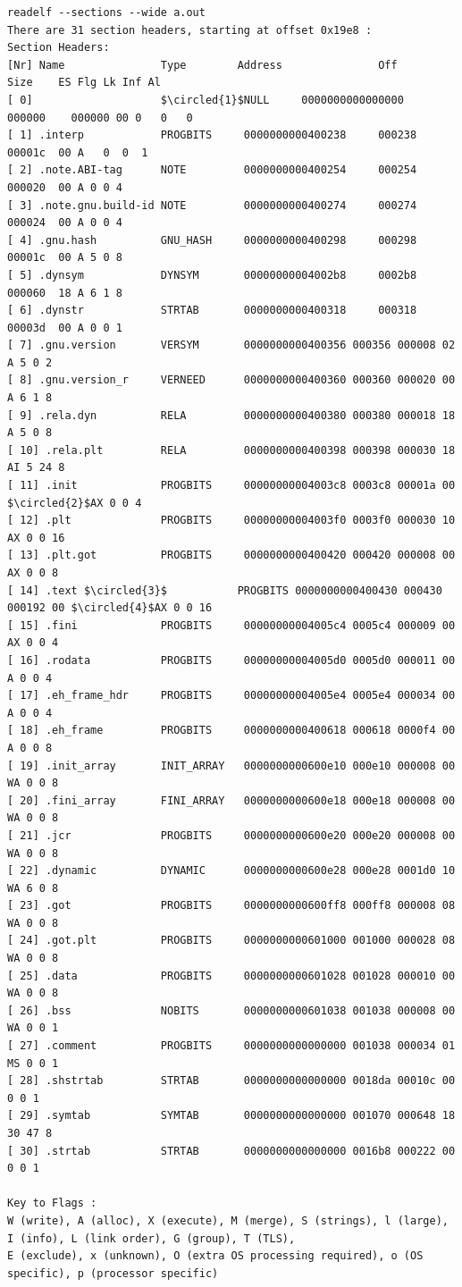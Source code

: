 \documentclass[]{project_plan}
\newcommand*\circled[1]{\tikz[baseline=(char.base)]{
            \node[shape=circle,draw,inner sep=2pt] (char) {#1};}}
\begin{document}
\begin{lstlisting}[mathescape]
readelf --sections --wide a.out
There are 31 section headers, starting at offset 0x19e8 :
Section Headers:
[Nr] Name               Type        Address               Off       Size    ES Flg Lk Inf Al
[ 0]                    $\circled{1}$NULL     0000000000000000     000000    000000 00 0   0   0
[ 1] .interp            PROGBITS     0000000000400238     000238    00001c  00 A   0  0  1
[ 2] .note.ABI-tag      NOTE         0000000000400254     000254    000020  00 A 0 0 4
[ 3] .note.gnu.build-id NOTE         0000000000400274     000274    000024  00 A 0 0 4
[ 4] .gnu.hash          GNU_HASH     0000000000400298     000298    00001c  00 A 5 0 8
[ 5] .dynsym            DYNSYM       00000000004002b8     0002b8    000060  18 A 6 1 8
[ 6] .dynstr            STRTAB       0000000000400318     000318    00003d  00 A 0 0 1
[ 7] .gnu.version       VERSYM       0000000000400356 000356 000008 02 A 5 0 2
[ 8] .gnu.version_r     VERNEED      0000000000400360 000360 000020 00 A 6 1 8
[ 9] .rela.dyn          RELA         0000000000400380 000380 000018 18 A 5 0 8
[ 10] .rela.plt         RELA         0000000000400398 000398 000030 18 AI 5 24 8
[ 11] .init             PROGBITS     00000000004003c8 0003c8 00001a 00 $\circled{2}$AX 0 0 4
[ 12] .plt              PROGBITS     00000000004003f0 0003f0 000030 10 AX 0 0 16
[ 13] .plt.got          PROGBITS     0000000000400420 000420 000008 00 AX 0 0 8
[ 14] .text $\circled{3}$           PROGBITS 0000000000400430 000430 000192 00 $\circled{4}$AX 0 0 16
[ 15] .fini             PROGBITS     00000000004005c4 0005c4 000009 00 AX 0 0 4
[ 16] .rodata           PROGBITS     00000000004005d0 0005d0 000011 00 A 0 0 4
[ 17] .eh_frame_hdr     PROGBITS     00000000004005e4 0005e4 000034 00 A 0 0 4
[ 18] .eh_frame         PROGBITS     0000000000400618 000618 0000f4 00 A 0 0 8
[ 19] .init_array       INIT_ARRAY   0000000000600e10 000e10 000008 00 WA 0 0 8
[ 20] .fini_array       FINI_ARRAY   0000000000600e18 000e18 000008 00 WA 0 0 8
[ 21] .jcr              PROGBITS     0000000000600e20 000e20 000008 00 WA 0 0 8
[ 22] .dynamic          DYNAMIC      0000000000600e28 000e28 0001d0 10 WA 6 0 8
[ 23] .got              PROGBITS     0000000000600ff8 000ff8 000008 08 WA 0 0 8
[ 24] .got.plt          PROGBITS     0000000000601000 001000 000028 08 WA 0 0 8
[ 25] .data             PROGBITS     0000000000601028 001028 000010 00 WA 0 0 8
[ 26] .bss              NOBITS       0000000000601038 001038 000008 00 WA 0 0 1
[ 27] .comment          PROGBITS     0000000000000000 001038 000034 01 MS 0 0 1
[ 28] .shstrtab         STRTAB       0000000000000000 0018da 00010c 00 0 0 1
[ 29] .symtab           SYMTAB       0000000000000000 001070 000648 18 30 47 8
[ 30] .strtab           STRTAB       0000000000000000 0016b8 000222 00 0 0 1

Key to Flags :
W (write), A (alloc), X (execute), M (merge), S (strings), l (large), I (info), L (link order), G (group), T (TLS),
E (exclude), x (unknown), O (extra OS processing required), o (OS specific), p (processor specific)
\end{lstlisting}
\end{document}
